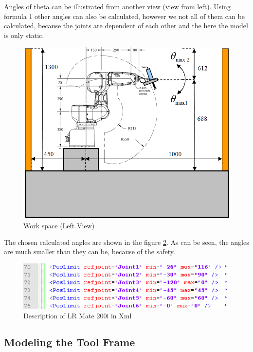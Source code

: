 Angles of theta can be illustrated from another view (view from left). Using formula 1 other angles can also be calculated, however we not all of them can be calculated, because the joints are dependent of each other and the here the model is only static. 

\begin{figure}[H]
  \centering
  \includegraphics[scale= 0.6]{source/JointWorkspace.png}
  \caption{Work space (Left View)}
  \label{fig:JointWorkspace}
\end{figure}

The chosen calculated angles are shown in the figure \ref{fig:angleXML}. As can be seen, the angles are much smaller than they can be, because of the safety. 

\begin{figure}[H]
  \centering
  \includegraphics[scale= 0.8]{source/angleXML.png}
  \caption{Description of LR Mate 200i in Xml}
  \label{fig:angleXML}
\end{figure}

\subsection {Modeling the Tool Frame}

